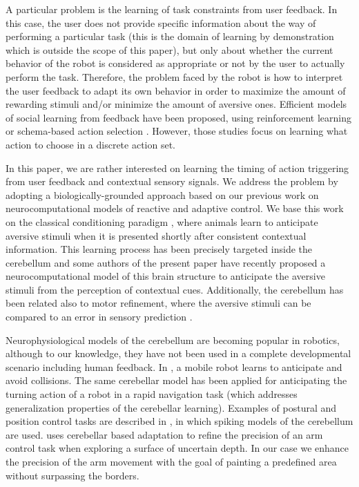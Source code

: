 \documentclass[letterpaper, 10 pt, conference]{ieeeconf}  %
\begin{document}
A particular problem is the learning of task constraints from user feedback. In this case, the user does not provide specific information about the way of performing a particular task (this is the domain of learning by demonstration which is outside the scope of this paper), but only about whether the current behavior of the robot is considered as appropriate or not by the user to actually perform the task. Therefore, the problem faced by the robot is how to interpret the user feedback to adapt its own behavior in order to maximize the amount of rewarding stimuli and/or minimize the amount of aversive ones. Efficient models of social learning from feedback have been proposed, using reinforcement learning \cite{blumberg2002integrated,isbell2001social} or schema-based action selection \cite{kaplan2002robotic}. However, those studies focus on learning what action to choose in a discrete action set.

In this paper, we are rather interested on learning the timing of action triggering from user feedback and contextual sensory signals. We address the problem by adopting a biologically-grounded approach based on our previous work on neurocomputational models of reactive and adaptive control. We base this work on the classical conditioning paradigm \cite{pavlov1927conditioned}, where animals learn to anticipate aversive stimuli when it is presented shortly after consistent contextual information. This learning process has been precisely targeted inside the cerebellum \cite{christian2003neural, yeo1998cerebellum} and some authors of the present paper have recently proposed a neurocomputational model of this brain structure \cite{herreros2013nucleo} to anticipate the aversive stimuli from the perception of contextual cues. Additionally, the cerebellum has been related also to motor refinement, where the aversive stimuli can be compared to an error in sensory prediction \cite{houk2003}.

Neurophysiological models of the cerebellum are becoming popular in robotics, although to our knowledge, they have not been used in a complete developmental scenario including human feedback. In \cite{hofstoetter2002cerebellum}, a mobile robot learns to anticipate and avoid collisions. The same cerebellar model has been applied for anticipating the turning action of a robot in a rapid navigation task  \cite{herreros2013speed} (which addresses generalization properties of the cerebellar learning). Examples of postural and position control tasks are described in \cite{pinzon2015realistic}, in which spiking models of the cerebellum are used. \cite{barron2013cerebellum} uses cerebellar based adaptation to refine the precision of an arm control task when exploring a surface of uncertain depth. In our case we enhance the precision of the arm movement with the goal of painting a predefined area without surpassing the borders.  
\end{document}
